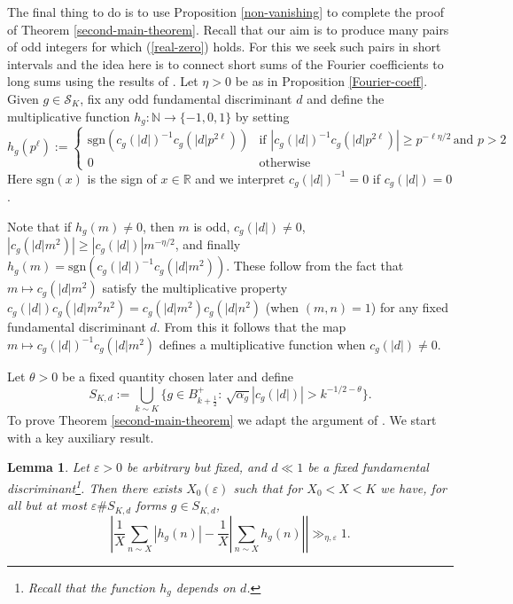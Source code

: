 \documentclass[a4paper,10pt,twoside]{amsart}
\newtheorem{lemma}[theorem]{Lemma}
\theoremstyle{definition}
\numberwithin{equation}{section}
\newcommand\R{\mathbb{R}}
\newcommand\N{\mathbb{N}}
\renewcommand\:{\colon}
\begin{document}
The final thing to do is to use Proposition \ref{non-vanishing} to complete the proof of Theorem \ref{second-main-theorem}. Recall that our aim is to produce many pairs of odd integers for which (\ref{real-zero}) holds. For this we seek such pairs in short intervals and the idea here is to connect short sums of the Fourier coefficients to long sums using the results of \cite{Matomaki-Radziwill2016}. Let $\eta>0$ be as in Proposition \ref{Fourier-coeff}. Given $g\in \mathcal S_K$, fix any odd fundamental discriminant $d$ and define the multiplicative function $h_g:\N\longrightarrow\{-1,0,1\}$ by setting
\[
h_g(p^\ell):=\begin{cases}
\text{sgn}(c_g(|d|)^{-1}c_g(|d|p^{2\ell})) & \text{if }|c_g(|d|)^{-1}c_g(|d|p^{2\ell})|\geq p^{-\ell\eta/2}\,\text{and }p>2\\
0 & \text{otherwise}
\end{cases} 
\] 
Here $\text{sgn}(x)$ is the sign of $x\in\R$ and we interpret $c_g(|d|)^{-1}=0$ if $c_g(|d|)=0$.

Note that if $h_g(m)\neq 0$, then $m$ is odd, $c_g(|d|)\neq 0$, $|c_g(|d|m^2)|\geq |c_g(|d|)|m^{-\eta/2}$, and finally $h_g(m)=\text{sgn}(c_g(|d|)^{-1}c_g(|d|m^2))$. These follow from the fact that $m\mapsto c_g(|d|m^2)$ satisfy the multiplicative property $c_g(|d|)c_g(|d|m^2n^2)=c_g(|d|m^2)c_g(|d|n^2)$ (when $(m,n)=1$) \cite[(1.18)]{Shimura1973} for any fixed fundamental discriminant $d$. From this it follows that the map $m\mapsto c_g(|d|)^{-1}c_g(|d|m^2)$ defines a multiplicative function when $c_g(|d|)\neq 0$. 

Let $\theta>0$ be a fixed quantity chosen later and define 
\[
S_{K,d}:=\bigcup_{k\sim K}\{g\in B_{k+\frac12}^+:\,\sqrt{\alpha_g}|c_g(|d|)|> k^{-1/2-\theta}\}.
\] 
To prove Theorem \ref{second-main-theorem} we adapt the argument of \cite[Section 3]{Lester-Matomaki-Radziwill2018}. We start with a key auxiliary result. 

\begin{lemma}\label{final-key-lemma}
Let $\varepsilon>0$ be arbitrary but fixed, and $d\ll 1$ be a fixed fundamental discriminant\footnote{Recall that the function $h_g$ depends on $d$.}. Then there exists $X_0(\varepsilon)$ such that for $X_0<X<K$ we have, for all but at most $\varepsilon\# S_{K,d}$ forms $g\in S_{K,d}$,
\[ 
\left|\frac1X\sum_{n\sim X}|h_g(n)|-\frac1X\left|\sum_{n\sim X}h_g(n)\right|\right|\gg_{\eta,\varepsilon} 1.\]
\end{lemma} 
\end{document}
